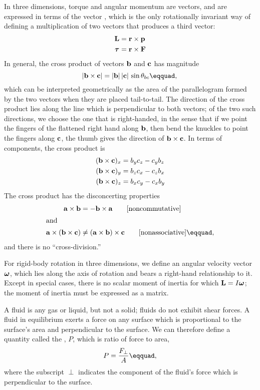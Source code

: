 	In three dimensions, torque and angular momentum are vectors, and are expressed
	in terms of the vector , which is the only
	rotationally invariant way of defining a multiplication of two vectors
	that produces a third vector:
	\begin{align*}
		\mathbf{L}	&= \mathbf{r}\times\mathbf{p}\\
		\boldsymbol{\tau}	&= \mathbf{r}\times\mathbf{F}
	\end{align*}
	In general, the cross product of vectors $\mathbf{b}$ and $\mathbf{c}$ has
	magnitude
	\begin{equation*}
		|\vc{b}\times\vc{c}|	= |\vc{b}|\,|\vc{c}|\,\sin\theta_{bc}\eqquad,\\
	\end{equation*}
	which can be interpreted geometrically as the area of the parallelogram
	formed by the two vectors when they are placed tail-to-tail.
	The direction of the cross product lies along the line which is perpendicular
	to both vectors; of the two such directions, we choose the one that is right-handed,
	in the sense that if we point the fingers of the flattened right hand along
	$\mathbf{b}$, then bend the knuckles to point the fingers along $\mathbf{c}$, the thumb
	gives the direction of $\mathbf{b}\times\mathbf{c}$. In terms of components, the
	cross product is
	\begin{align*}
	(\mathbf{b}\times\mathbf{c})_x	&=  b_yc_z - c_yb_z\\
	(\mathbf{b}\times\mathbf{c})_y	&=  b_zc_x - c_zb_x\\
	(\mathbf{b}\times\mathbf{c})_z	&=  b_xc_y - c_xb_y
	\end{align*}
	The  cross product 
	has the disconcerting properties
	\begin{align*}
		\vc{a}\times\vc{b} &= -\vc{b}\times\vc{a} \qquad \text{[noncommutative]}\\
		\intertext{and}
		\vc{a}\times(\vc{b}\times\vc{c}) &\ne (\vc{a}\times\vc{b})\times\vc{c} \qquad \text{[nonassociative]}\eqquad,
	\end{align*}
	and there is no ``cross-division.''
	
	For rigid-body rotation in three dimensions, we define an angular velocity
	vector $\boldsymbol{\omega}$, which lies along the axis of rotation and bears a right-hand
	relationship to it. Except in special cases, there is no scalar moment of
	inertia for which $\mathbf{L}=I\boldsymbol{\omega}$; the moment of inertia must be expressed
	as a matrix.
	
	A fluid is any gas or liquid, but not a solid; fluids do not
	exhibit shear forces. A fluid in equilibrium exerts a force
	on any surface which is proportional to the surface's area
	and perpendicular to the surface. We can therefore define a
	quantity called the , $P$, which is ratio of force to area,
	\begin{equation*}
			P =     \frac{F_\perp}{A}\eqquad,  
	\end{equation*}
	where the subscript $\perp$ indicates the component of the fluid's
	force which is perpendicular to the surface.
	
